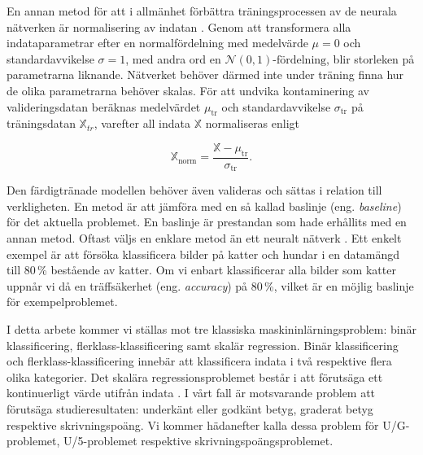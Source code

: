En annan metod för att i allmänhet förbättra träningsprocessen av de neurala nätverken är normalisering av indatan \cite{Chollet}. Genom att transformera alla indataparametrar efter en normalfördelning med medelvärde $\mu = 0$ och standardavvikelse $\sigma = 1$, med andra ord en $\mathcal{N}(0,1)\text{-fördelning}$, blir storleken på parametrarna liknande. Nätverket behöver därmed inte under träning finna hur de olika parametrarna behöver skalas. För att undvika kontaminering av valideringsdatan beräknas medelvärdet $\mu_\mathrm{tr}$ och standardavvikelse $\sigma_\mathrm{tr}$ på träningsdatan $\mathbb{X}_{tr}$, varefter all indata $\mathbb{X}$ normaliseras enligt 

\begin{equation}
    \mathbb{X}_\mathrm{norm} = \frac{\mathbb{X}-\mu_\mathrm{tr}}{\sigma_\mathrm{tr}}.
    \label{normalization}
\end{equation}

Den färdigtränade modellen behöver även valideras och sättas i relation till verkligheten. En metod är att jämföra med en så kallad baslinje (eng. \emph{baseline}) för det aktuella problemet. En baslinje är prestandan som hade erhållits med en annan metod. Oftast väljs en enklare metod än ett neuralt nätverk \cite{Chollet}. Ett enkelt exempel är att försöka klassificera bilder på katter och hundar i en datamängd till 80\,\% bestående av katter. Om vi enbart klassificerar alla bilder som katter uppnår vi då en träffsäkerhet (eng. \emph{accuracy}) på 80\,\%, vilket är en möjlig baslinje för exempelproblemet.

I detta arbete kommer vi ställas mot tre klassiska maskininlärningsproblem: binär klassificering, flerklass-klassificering samt skalär regression. Binär klassificering och flerklass-klassificering innebär att klassificera indata i två respektive flera olika kategorier. Det skalära regressionsproblemet består i att förutsäga ett kontinuerligt värde utifrån indata \cite{Chollet}. I vårt fall är motsvarande problem att förutsäga studieresultaten: underkänt eller godkänt betyg, graderat betyg respektive skrivningspoäng. Vi kommer hädanefter kalla dessa problem för U/G-problemet, U/5-problemet respektive skrivningspoängsproblemet.

